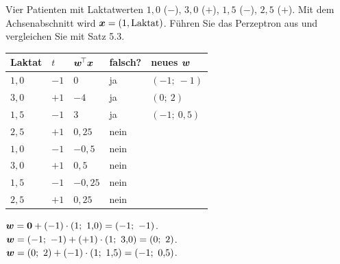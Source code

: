 \begin{aufgabe}
\begin{center}
\begin{minipage}{0.88\textwidth}
\end{minipage}
\end{center}
\end{aufgabe}

\begin{aufgabe}
Vier Patienten mit Laktatwerten $1{,}0$ ($-$), $3{,}0$ ($+$), $1{,}5$ ($-$), $2{,}5$ ($+$). Mit dem Achsenabschnitt wird $\boldsymbol{x} = (1, \text{Laktat})$. Führen Sie das Perzeptron aus und vergleichen Sie mit Satz 5.3.

\loesung
{}
\begin{center}
{\small
\renewcommand{\arraystretch}{1.46}
\begin{tabular}{@{}P{1.4cm}P{1.0cm}P{1.8cm}P{1.6cm}P{2.0cm}@{}}
\toprule
\textbf{Laktat} & $t$ & $\boldsymbol{w}^{\!\top}\boldsymbol{x}$ & \textbf{falsch?} & \textbf{neues} $\boldsymbol{w}$\\
\midrule
$1{,}0$ & $-1$ & $0$ & ja & $(-1;\ -1)$\\
$3{,}0$ & $+1$ & $-4$ & ja & $(0;\ 2)$\\
$1{,}5$ & $-1$ & $3$ & ja & $(-1;\ 0{,}5)$\\
$2{,}5$ & $+1$ & $0{,}25$ & nein & \\
\midrule
$1{,}0$ & $-1$ & $-0{,}5$ & nein & \\
$3{,}0$ & $+1$ & $0{,}5$ & nein & \\
$1{,}5$ & $-1$ & $-0{,}25$ & nein & \\
$2{,}5$ & $+1$ & $0{,}25$ & nein & \\
\bottomrule
\end{tabular}}
\end{center}

 $\boldsymbol{w} = \boldsymbol{0} + (-1)\cdot(1;\ 1{,}0) = (-1;\ -1)$.\\
 $\boldsymbol{w} = (-1;\ -1) + (+1)\cdot(1;\ 3{,}0) = (0;\ 2)$.\\
 $\boldsymbol{w} = (0;\ 2) + (-1)\cdot(1;\ 1{,}5) = (-1;\ 0{,}5)$.


\end{aufgabe}
